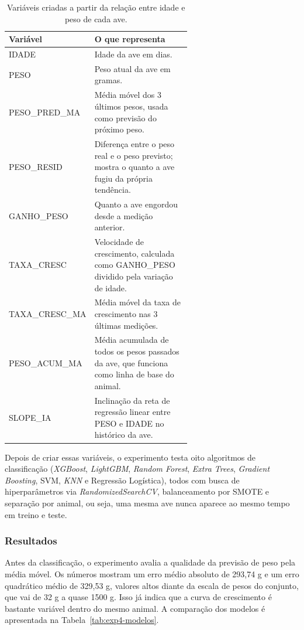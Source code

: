 \documentclass[12pt]{article}
\begin{document}
\begin{table}[htbp]
\centering
\caption{Variáveis criadas a partir da relação entre idade e peso de cada ave.}
\label{tab:exp4-features}
\begin{tabular}{lp{0.62\linewidth}}
\hline
\textbf{Variável} & \textbf{O que representa} \\
\hline
IDADE & Idade da ave em dias. \\
PESO & Peso atual da ave em gramas. \\
PESO\_PRED\_MA & Média móvel dos 3 últimos pesos, usada como previsão do próximo peso. \\
PESO\_RESID & Diferença entre o peso real e o peso previsto; mostra o quanto a ave fugiu da própria tendência. \\
GANHO\_PESO & Quanto a ave engordou desde a medição anterior. \\
TAXA\_CRESC & Velocidade de crescimento, calculada como GANHO\_PESO dividido pela variação de idade. \\
TAXA\_CRESC\_MA & Média móvel da taxa de crescimento nas 3 últimas medições. \\
PESO\_ACUM\_MA & Média acumulada de todos os pesos passados da ave, que funciona como linha de base do animal. \\
SLOPE\_IA & Inclinação da reta de regressão linear entre PESO e IDADE no histórico da ave. \\
\hline
\end{tabular}
\end{table}

Depois de criar essas variáveis, o experimento testa oito algoritmos de
classificação (\textit{XGBoost}, \textit{LightGBM}, \textit{Random Forest},
\textit{Extra Trees}, \textit{Gradient Boosting}, SVM, \textit{KNN} e Regressão
Logística), todos com busca de hiperparâmetros via \textit{RandomizedSearchCV},
balanceamento por SMOTE e separação por animal, ou seja, uma mesma ave nunca
aparece ao mesmo tempo em treino e teste.

\subsubsection{Resultados}

Antes da classificação, o experimento avalia a qualidade da previsão de peso
pela média móvel. Os números mostram um erro médio absoluto de 293,74 g e um
erro quadrático médio de 329,53 g, valores altos diante da escala de pesos do
conjunto, que vai de 32 g a quase 1500 g. Isso já indica que a curva de
crescimento é bastante variável dentro do mesmo animal. A comparação dos modelos
é apresentada na Tabela~\ref{tab:exp4-modelos}.
\end{document}

